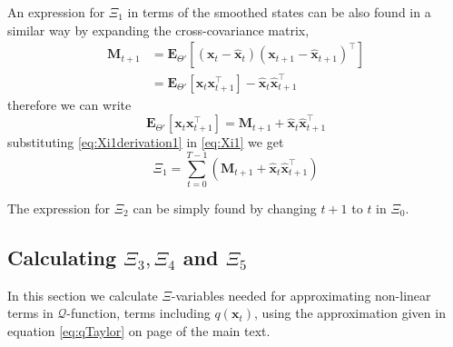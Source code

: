 \documentclass[]{article}
\begin{document}
An expression for $\Xi_1$ in terms of the smoothed states can be also found in a similar way by expanding the cross-covariance matrix,
\begin{align}
 \mathbf M_{t+1}&=\mathbf E_{\Theta'}\left[(\mathbf x_t-\mathbf{\hat x}_t)(\mathbf x_{t+1}-\mathbf{\hat x}_{t+1})^\top\right] \nonumber \\
&=\mathbf E_{\Theta'}\left[\mathbf x_t\mathbf x_{t+1}^\top\right]-\mathbf {\hat x}_t\mathbf{\hat x}_{t+1}^\top
\end{align}
therefore we can write
\begin{equation}\label{eq:Xi1derivation1}
 \mathbf E_{\Theta'}\left[\mathbf x_t\mathbf x_{t+1}^\top\right]=\mathbf M_{t+1}+\mathbf {\hat x}_t\mathbf{\hat x}_{t+1}^\top
\end{equation}
substituting \ref{eq:Xi1derivation1} in \ref{eq:Xi1} we get
\begin{equation}
 \Xi_1=\sum_{t=0}^{T-1}\left(\mathbf M_{t+1}+\mathbf{\hat x}_t\mathbf{\hat x}_{t+1}^\top\right)
\end{equation}


 The expression for $\Xi_2$ can be simply found by changing $t+1$ to $t$ in $\Xi_0$.

\subsection*{Calculating $\Xi_{3},\Xi_{4}$ and $\Xi_{5}$}
In this section we calculate $\Xi$-variables needed for approximating non-linear terms in $\mathcal{Q}$-function, terms including $q\left(\mathbf x_t\right)$, using the approximation given in equation \ref{eq:qTaylor} on page \pageref{eq:qTaylor} of the main text.
\end{document}

